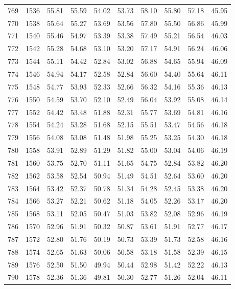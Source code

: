 \begin{longtable}{rrllllllll}
		769 & 1536 & 55.81 & 55.59 & 54.02 & 53.73 & 58.10 & 55.80 & 57.18 & 45.95 \\ 
		770 & 1538 & 55.64 & 55.27 & 53.69 & 53.56 & 57.80 & 55.50 & 56.86 & 45.99 \\ 
		771 & 1540 & 55.46 & 54.97 & 53.39 & 53.38 & 57.49 & 55.21 & 56.54 & 46.03 \\ 
		772 & 1542 & 55.28 & 54.68 & 53.10 & 53.20 & 57.17 & 54.91 & 56.24 & 46.06 \\ 
		773 & 1544 & 55.11 & 54.42 & 52.84 & 53.02 & 56.88 & 54.65 & 55.94 & 46.09 \\ 
		774 & 1546 & 54.94 & 54.17 & 52.58 & 52.84 & 56.60 & 54.40 & 55.64 & 46.11 \\ 
		775 & 1548 & 54.77 & 53.93 & 52.33 & 52.66 & 56.32 & 54.16 & 55.36 & 46.13 \\ 
		776 & 1550 & 54.59 & 53.70 & 52.10 & 52.49 & 56.04 & 53.92 & 55.08 & 46.14 \\ 
		777 & 1552 & 54.42 & 53.48 & 51.88 & 52.31 & 55.77 & 53.69 & 54.81 & 46.16 \\ 
		778 & 1554 & 54.24 & 53.28 & 51.68 & 52.15 & 55.51 & 53.47 & 54.56 & 46.18 \\ 
		779 & 1556 & 54.08 & 53.08 & 51.48 & 51.98 & 55.25 & 53.25 & 54.30 & 46.18 \\ 
		780 & 1558 & 53.91 & 52.89 & 51.29 & 51.82 & 55.00 & 53.04 & 54.06 & 46.19 \\ 
		781 & 1560 & 53.75 & 52.70 & 51.11 & 51.65 & 54.75 & 52.84 & 53.82 & 46.20 \\ 
		782 & 1562 & 53.58 & 52.54 & 50.94 & 51.49 & 54.51 & 52.64 & 53.60 & 46.20 \\ 
		783 & 1564 & 53.42 & 52.37 & 50.78 & 51.34 & 54.28 & 52.45 & 53.38 & 46.20 \\ 
		784 & 1566 & 53.27 & 52.21 & 50.62 & 51.18 & 54.05 & 52.26 & 53.17 & 46.20 \\ 
		785 & 1568 & 53.11 & 52.05 & 50.47 & 51.03 & 53.82 & 52.08 & 52.96 & 46.19 \\ 
		786 & 1570 & 52.96 & 51.91 & 50.32 & 50.87 & 53.61 & 51.91 & 52.77 & 46.17 \\ 
		787 & 1572 & 52.80 & 51.76 & 50.19 & 50.73 & 53.39 & 51.73 & 52.58 & 46.16 \\ 
		788 & 1574 & 52.65 & 51.63 & 50.06 & 50.58 & 53.18 & 51.58 & 52.39 & 46.15 \\ 
		789 & 1576 & 52.50 & 51.50 & 49.94 & 50.44 & 52.98 & 51.42 & 52.22 & 46.13 \\ 
		790 & 1578 & 52.36 & 51.36 & 49.81 & 50.30 & 52.77 & 51.26 & 52.04 & 46.11 \\ 

\end{longtable}
